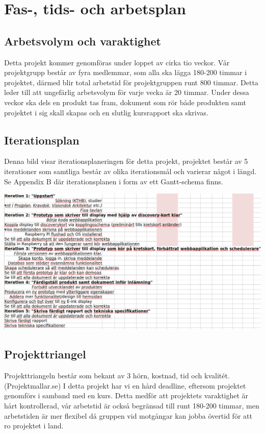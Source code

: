 \documentclass[11pt]{article}
\begin{document}
\section{Fas-, tids- och arbetsplan}
\label{sec:orge39d09e}
\subsection{Arbetsvolym och varaktighet}
\label{sec:orgb307f13}

Detta projekt kommer genomföras under loppet av cirka tio veckor. Vår projektgrupp består
av fyra medlemmar, som alla ska lägga 180-200 timmar i projektet, därmed blir total arbetstid för
projektgruppen runt 800 timmar. Detta leder till att ungefärlig arbetsvolym för varje vecka är
20 timmar. Under dessa veckor ska dels en produkt tas fram, dokument som rör både produkten samt
projektet i sig skall skapas och en slutlig kursrapport ska skrivas.

\subsection{Iterationsplan}
\label{sec:org5de4b57}

Denna bild visar iterationsplaneringen för detta
projekt, projektet består av 5 iterationer som samtliga består av olika
iterationsmål och varierar något i längd. Se Appendix B där iterationsplanen i form av ett Gantt-schema finns.
\begin{center}
\includegraphics[width=.9\linewidth]{../Iterationsplanering.png}
\end{center}
\subsection{Projekttriangel}
\label{sec:org3193ca3}

Projekttriangeln består som bekant av 3 hörn, kostnad, tid och kvalitét. (Projektmallar.se)
I detta projekt har vi en hård deadline, eftersom projektet genomförs i samband med en kurs. Detta medför
att projektets varaktighet är hårt kontrollerad, vår arbetstid är också begränsad till runt
180-200 timmar, men arbetstiden är mer flexibel då gruppen vid motgångar kan jobba övertid
för att ro projektet i land.
\end{document}
